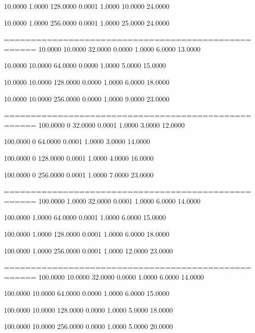    10.0000    1.0000  128.0000    0.0001    1.0000   10.0000   24.0000

   10.0000    1.0000  256.0000    0.0001    1.0000   25.0000   24.0000

====================================================
   10.0000   10.0000   32.0000    0.0000    1.0000    6.0000   13.0000

   10.0000   10.0000   64.0000    0.0000    1.0000    5.0000   15.0000

   10.0000   10.0000  128.0000    0.0000    1.0000    6.0000   18.0000

   10.0000   10.0000  256.0000    0.0000    1.0000    9.0000   23.0000

====================================================
  100.0000         0   32.0000    0.0001    1.0000    3.0000   12.0000

  100.0000         0   64.0000    0.0001    1.0000    3.0000   14.0000

  100.0000         0  128.0000    0.0001    1.0000    4.0000   16.0000

  100.0000         0  256.0000    0.0001    1.0000    7.0000   23.0000

====================================================
  100.0000    1.0000   32.0000    0.0001    1.0000    6.0000   14.0000

  100.0000    1.0000   64.0000    0.0001    1.0000    6.0000   15.0000

  100.0000    1.0000  128.0000    0.0001    1.0000    6.0000   18.0000

  100.0000    1.0000  256.0000    0.0001    1.0000   12.0000   23.0000

====================================================
  100.0000   10.0000   32.0000    0.0000    1.0000    6.0000   14.0000

  100.0000   10.0000   64.0000    0.0000    1.0000    6.0000   15.0000

  100.0000   10.0000  128.0000    0.0000    1.0000    5.0000   18.0000

  100.0000   10.0000  256.0000    0.0000    1.0000    5.0000   20.0000


